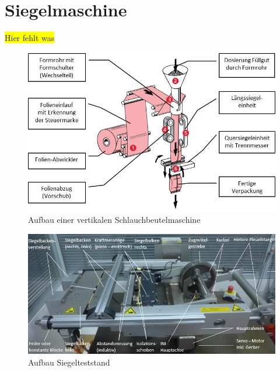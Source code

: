 \section{Siegelmaschine}
\colorbox{yellow}{Hier fehlt was}

\begin{figure}[h]
    \centering
    \includegraphics[width=\textwidth]{images/kapitel_5/vffs.jpg}
    \caption{Aufbau einer vertikalen Schlauchbeutelmaschine~\cite{online_grundlagen_boschkwe}}
    \label{fig:siegelmaschinen_vffs}
\end{figure}

\begin{figure}[h]
    \centering
    \includegraphics[width=\textwidth]{images/kapitel_5/vffs_simulator.png}
    \caption{Aufbau Siegelteststand}
    \label{fig:siegelmaschinen_vffs_simulator}
\end{figure}